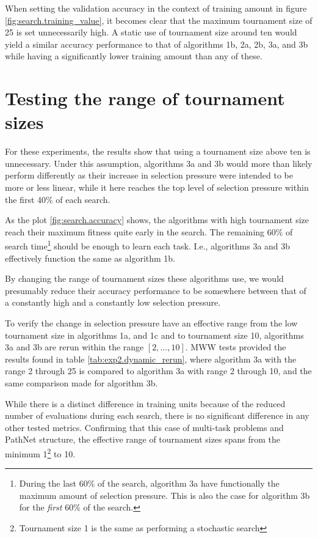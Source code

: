 When setting the validation accuracy in the context of training amount in figure \ref{fig:search.training_value}, it becomes clear that the maximum tournament size of 25 is set unnecessarily high. A static use of tournament size around ten would yield a similar accuracy performance to that of algorithms 1b, 2a, 2b, 3a, and 3b while having a significantly lower training amount than any of these.

\section{Testing the range of tournament sizes}
For these experiments, the results show that using a tournament size above ten is unnecessary. Under this assumption, algorithms 3a and 3b would more than likely perform differently as their increase in selection pressure were intended to be more or less linear, while it here reaches the top level of selection pressure within the first 40\% of each search. 

As the plot \ref{fig:search.accuracy} shows, the algorithms with high tournament size reach their maximum fitness quite early in the search. The remaining 60\% of search time\footnote{During the last 60\% of the search, algorithm 3a have functionally the maximum amount of selection pressure. This is also the case for algorithm 3b for the \textit{first} 60\% of the search.} should be enough to learn each task. I.e., algorithms 3a and 3b effectively function the same as algorithm 1b.

By changing the range of tournament sizes these algorithms use, we would presumably reduce their accuracy performance to be somewhere between that of a constantly high and a constantly low selection pressure.

To verify the change in selection pressure have an effective range from the low tournament size in algorithms 1a, and 1c and to tournament size 10, algorithms 3a and 3b are rerun within the range \([2,\dots,10]\). MWW tests provided the results found in table \ref{tab:exp2.dynamic_rerun}, where algorithm 3a with the range 2 through 25 is compared to algorithm 3a with range 2 through 10, and the same comparison made for algorithm 3b. 



While there is a distinct difference in training units because of the reduced number of evaluations during each search, there is no significant difference in any other tested metrics. Confirming that this case of multi-task problems and PathNet structure, the effective range of tournament sizes spans from the minimum 1\footnote{Tournament size 1 is the same as performing a stochastic search} to 10.

